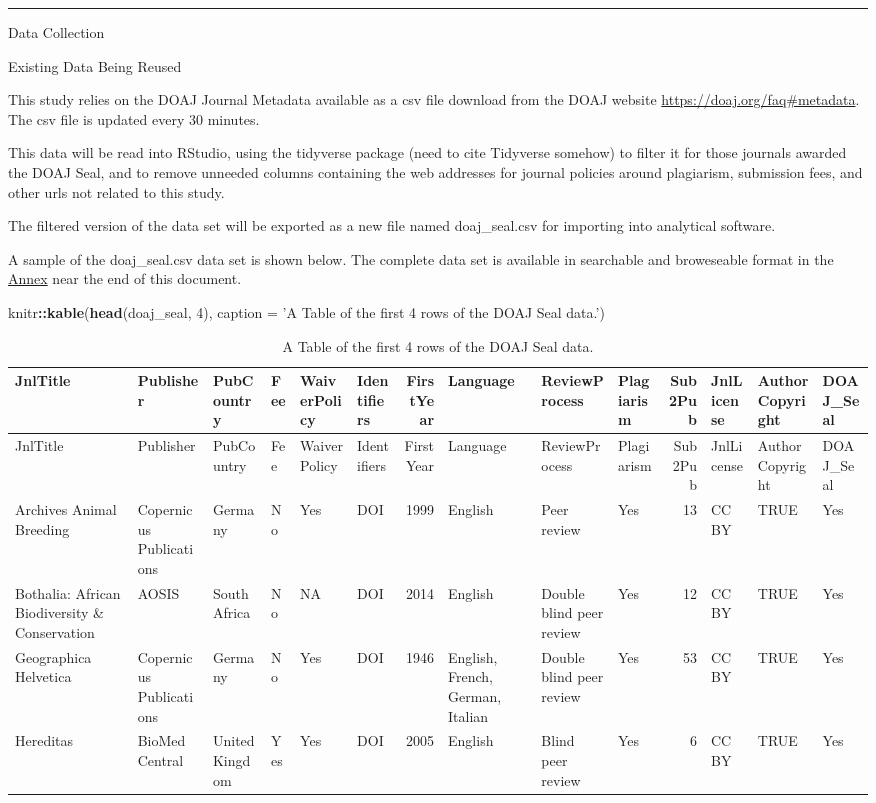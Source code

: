\documentclass[]{article}
\newenvironment{Shaded}{\begin{snugshade}}{\end{snugshade}}
\newcommand{\KeywordTok}[1]{\textcolor[rgb]{0.13,0.29,0.53}{\textbf{#1}}}
\newcommand{\DataTypeTok}[1]{\textcolor[rgb]{0.13,0.29,0.53}{#1}}
\newcommand{\DecValTok}[1]{\textcolor[rgb]{0.00,0.00,0.81}{#1}}
\newcommand{\StringTok}[1]{\textcolor[rgb]{0.31,0.60,0.02}{#1}}
\newcommand{\OperatorTok}[1]{\textcolor[rgb]{0.81,0.36,0.00}{\textbf{#1}}}
\newcommand{\NormalTok}[1]{#1}
\begin{document}
\begin{center}\rule{0.5\linewidth}{\linethickness}\end{center}

Data Collection

Existing Data Being Reused

This study relies on the DOAJ Journal Metadata available as a csv file
download from the DOAJ website \url{https://doaj.org/faq\#metadata}. The
csv file is updated every 30 minutes.

This data will be read into RStudio, using the tidyverse package (need
to cite Tidyverse somehow) to filter it for those journals awarded the
DOAJ Seal, and to remove unneeded columns containing the web addresses
for journal policies around plagiarism, submission fees, and other urls
not related to this study.

The filtered version of the data set will be exported as a new file
named doaj\_seal.csv for importing into analytical software.

A sample of the doaj\_seal.csv data set is shown below. The complete
data set is available in searchable and broweseable format in the
\protect\hyperlink{annex-table}{Annex} near the end of this document.

\begin{Shaded}
\begin{Highlighting}[]
\NormalTok{knitr}\OperatorTok{::}\KeywordTok{kable}\NormalTok{(}\KeywordTok{head}\NormalTok{(doaj_seal, }\DecValTok{4}\NormalTok{), }\DataTypeTok{caption =} \StringTok{'A Table of the first 4 rows of the DOAJ Seal data.'}\NormalTok{)}
\end{Highlighting}
\end{Shaded}

\begin{longtable}[]{@{}llllllrlllrlll@{}}
\caption{A Table of the first 4 rows of the DOAJ Seal
data.}\tabularnewline
\toprule
JnlTitle & Publisher & PubCountry & Fee & WaiverPolicy & Identifiers &
FirstYear & Language & ReviewProcess & Plagiarism & Sub2Pub & JnlLicense
& AuthorCopyright & DOAJ\_Seal\tabularnewline
\midrule
\endfirsthead
\toprule
JnlTitle & Publisher & PubCountry & Fee & WaiverPolicy & Identifiers &
FirstYear & Language & ReviewProcess & Plagiarism & Sub2Pub & JnlLicense
& AuthorCopyright & DOAJ\_Seal\tabularnewline
\midrule
\endhead
Archives Animal Breeding & Copernicus Publications & Germany & No & Yes
& DOI & 1999 & English & Peer review & Yes & 13 & CC BY & TRUE &
Yes\tabularnewline
Bothalia: African Biodiversity \& Conservation & AOSIS & South Africa &
No & NA & DOI & 2014 & English & Double blind peer review & Yes & 12 &
CC BY & TRUE & Yes\tabularnewline
Geographica Helvetica & Copernicus Publications & Germany & No & Yes &
DOI & 1946 & English, French, German, Italian & Double blind peer review
& Yes & 53 & CC BY & TRUE & Yes\tabularnewline
Hereditas & BioMed Central & United Kingdom & Yes & Yes & DOI & 2005 &
English & Blind peer review & Yes & 6 & CC BY & TRUE &
Yes\tabularnewline
\bottomrule
\end{longtable}
\end{document}
